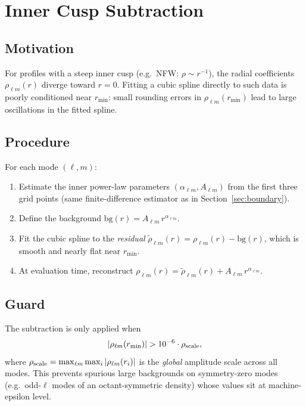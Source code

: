 \documentclass[11pt]{article}
\begin{document}
\section{Inner Cusp Subtraction}
\label{sec:cusp}

\subsection{Motivation}

For profiles with a steep inner cusp (e.g.\ NFW: $\rho \sim r^{-1}$), the
radial coefficients $\rho_{\ell m}(r)$ diverge toward $r=0$.  Fitting a
cubic spline directly to such data is poorly conditioned near $r_{\min}$:
small rounding errors in $\rho_{\ell m}(r_{\min})$ lead to large oscillations
in the fitted spline.

\subsection{Procedure}

For each mode $(\ell,m)$:
\begin{enumerate}
  \item Estimate the inner power-law parameters $(\alpha_{\ell m}, A_{\ell m})$
        from the first three grid points (same finite-difference estimator as
        in Section~\ref{sec:boundary}).
  \item Define the background $\mathrm{bg}(r) = A_{\ell m}\, r^{\alpha_{\ell m}}$.
  \item Fit the cubic spline to the \emph{residual}
        $\widetilde{\rho}_{\ell m}(r) = \rho_{\ell m}(r) - \mathrm{bg}(r)$,
        which is smooth and nearly flat near $r_{\min}$.
  \item At evaluation time, reconstruct
        $\rho_{\ell m}(r) = \widetilde{\rho}_{\ell m}(r) + A_{\ell m}\,
        r^{\alpha_{\ell m}}$.
\end{enumerate}

\subsection{Guard}

The subtraction is only applied when
\begin{equation}
  |\rho_{\ell m}(r_{\min})| > 10^{-6} \cdot \rho_{\rm scale},
\end{equation}
where $\rho_{\rm scale} = \max_{\ell m}\max_i |\rho_{\ell m}(r_i)|$ is the
\emph{global} amplitude scale across all modes.  This prevents spurious
large backgrounds on symmetry-zero modes (e.g.\ odd-$\ell$ modes of an
octant-symmetric density) whose values sit at machine-epsilon level.
\end{document}
